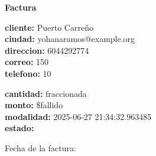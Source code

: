 \documentclass{article}
\begin{document}
\begin{center}
    {\LARGE \textbf{Factura}}\\[1cm]
\end{center}

\textbf{cliente:} Puerto Carreño \\
\textbf{ciudad:} yohanaramos@example.org \\
\textbf{direccion:} 6044292774 \\
\textbf{correo:} 150 \\
\textbf{telefono:} 10 \\

\vspace{0.5cm}

\textbf{cantidad:} fraccionada \\
\textbf{monto:} \$fallido \\
\textbf{modalidad:} 2025-06-27 21:34:32.963485 \\
\textbf{estado:}  \\

\vspace{1cm}

Fecha de la factura: 
\end{document}
